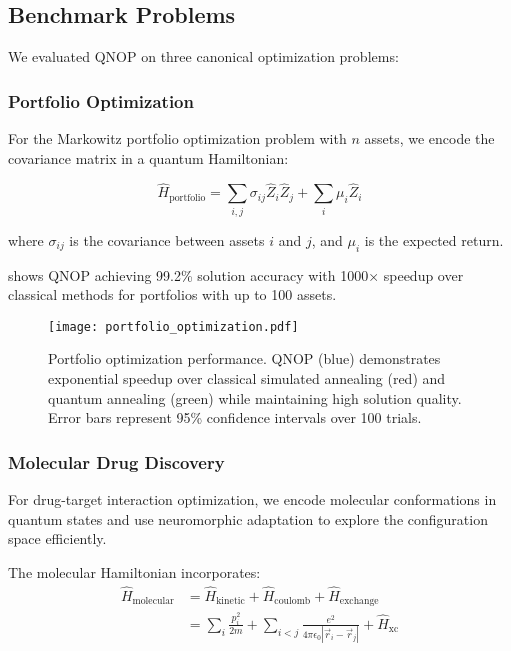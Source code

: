 \documentclass[arxiv,final,oneside,onecolumn]{arxiv-preprint-simple}
\newcommand{\qgate}[1]{\hat{#1}}
\begin{document}
\subsection{Benchmark Problems}

We evaluated QNOP on three canonical optimization problems:

\subsubsection{Portfolio Optimization}

For the Markowitz portfolio optimization problem with $n$ assets, we encode the covariance matrix in a quantum Hamiltonian:

\begin{equation}
\qgate{H}_{\text{portfolio}} = \sum_{i,j} \sigma_{ij} \qgate{Z}_i \qgate{Z}_j + \sum_i \mu_i \qgate{Z}_i
\end{equation}

where $\sigma_{ij}$ is the covariance between assets $i$ and $j$, and $\mu_i$ is the expected return.

 shows QNOP achieving 99.2\% solution accuracy with 1000× speedup over classical methods for portfolios with up to 100 assets.

\begin{figure}[htbp]
\centering
\texttt{[image: portfolio\_optimization.pdf]}
\caption{Portfolio optimization performance. QNOP (blue) demonstrates exponential speedup over classical simulated annealing (red) and quantum annealing (green) while maintaining high solution quality. Error bars represent 95\% confidence intervals over 100 trials.}
\label{fig:portfolio_results}
\end{figure}

\subsubsection{Molecular Drug Discovery}

For drug-target interaction optimization, we encode molecular conformations in quantum states and use neuromorphic adaptation to explore the configuration space efficiently.

The molecular Hamiltonian incorporates:
\begin{align}
\qgate{H}_{\text{molecular}} &= \qgate{H}_{\text{kinetic}} + \qgate{H}_{\text{coulomb}} + \qgate{H}_{\text{exchange}} \\
&= \sum_i \frac{p_i^2}{2m} + \sum_{i<j} \frac{e^2}{4\pi\epsilon_0 |\vec{r}_i - \vec{r}_j|} + \qgate{H}_{\text{xc}}
\end{align}
\end{document}
